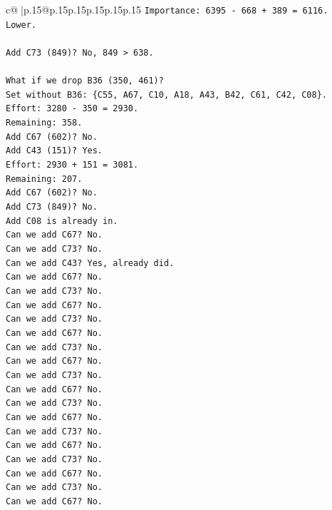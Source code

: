 \documentclass{article}
\begin{document}
{\begin{supertabular}{c@{$\;$}|p{.15\linewidth}@{}p{.15\linewidth}p{.15\linewidth}p{.15\linewidth}p{.15\linewidth}p{.15\linewidth}}
{{{\texttt{Importance: 6395 {-} 668 + 389 = 6116.} \\
\texttt{Lower.} \\
\\ 
\texttt{Add C73 (849)? No, 849 > 638.} \\
\\ 
\texttt{What if we drop B36 (350, 461)?} \\
\texttt{Set without B36: \{C55, A67, C10, A18, A43, B42, C61, C42, C08\}.} \\
\texttt{Effort: 3280 {-} 350 = 2930.} \\
\texttt{Remaining: 358.} \\
\texttt{Add C67 (602)? No.} \\
\texttt{Add C43 (151)? Yes.} \\
\texttt{Effort: 2930 + 151 = 3081.} \\
\texttt{Remaining: 207.} \\
\texttt{Add C67 (602)? No.} \\
\texttt{Add C73 (849)? No.} \\
\texttt{Add C08 is already in.} \\
\texttt{Can we add C67? No.} \\
\texttt{Can we add C73? No.} \\
\texttt{Can we add C43? Yes, already did.} \\
\texttt{Can we add C67? No.} \\
\texttt{Can we add C73? No.} \\
\texttt{Can we add C67? No.} \\
\texttt{Can we add C73? No.} \\
\texttt{Can we add C67? No.} \\
\texttt{Can we add C73? No.} \\
\texttt{Can we add C67? No.} \\
\texttt{Can we add C73? No.} \\
\texttt{Can we add C67? No.} \\
\texttt{Can we add C73? No.} \\
\texttt{Can we add C67? No.} \\
\texttt{Can we add C73? No.} \\
\texttt{Can we add C67? No.} \\
\texttt{Can we add C73? No.} \\
\texttt{Can we add C67? No.} \\
\texttt{Can we add C73? No.} \\
\texttt{Can we add C67? No.} \\
}}}
\end{supertabular}}
\end{document}
